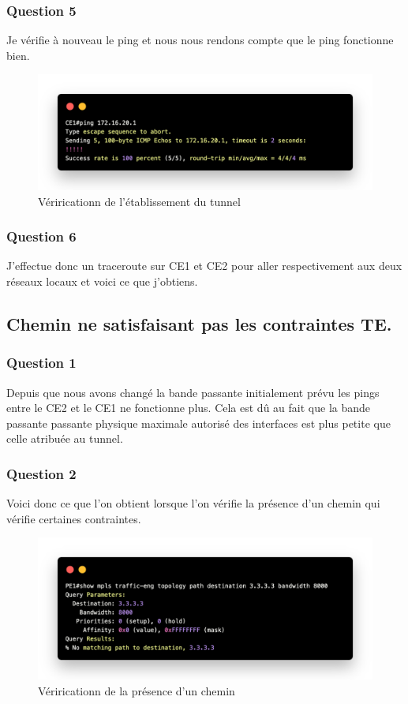 \documentclass[12pt, a4paper]{article}
\begin{document}
\subsubsection{Question 5}
Je vérifie à nouveau le ping et nous nous rendons compte que le ping 
fonctionne bien. 
\begin{figure}[h]
    \centering
    \includegraphics[width=1\textwidth]{img/code13.png}
    \caption{Vériricationn de l'établissement du tunnel}
    \label{fig:script13}
\end{figure}

\subsubsection{Question 6}
J'effectue donc un traceroute sur CE1 et CE2 pour aller respectivement aux deux réseaux locaux
et voici ce que j'obtiens. 



\subsection{Chemin ne satisfaisant pas les contraintes TE.}
\subsubsection{Question 1}
Depuis que nous avons changé la bande passante initialement prévu les pings entre
le CE2 et le CE1 ne fonctionne plus. Cela est dû au fait que la bande passante
passante physique maximale autorisé des interfaces est plus petite que celle atribuée au tunnel.


\newpage
\subsubsection{Question 2}
Voici donc ce que l'on obtient lorsque l'on vérifie la présence d'un chemin qui vérifie certaines contraintes.
\begin{figure}[h]
    \centering
    \includegraphics[width=1\textwidth]{img/code14.png}
    \caption{Vériricationn de la présence d'un chemin}
    \label{fig:script14}
\end{figure}
\end{document}
